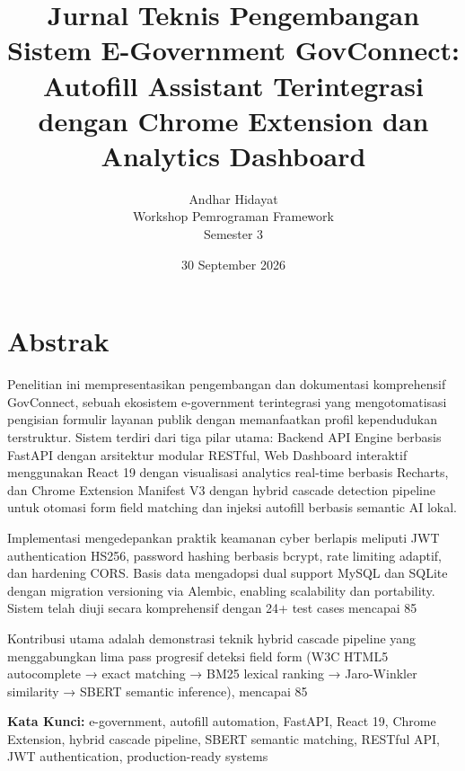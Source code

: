 \documentclass[12pt,a4paper]{article}
\title{\textbf{Jurnal Teknis Pengembangan Sistem E-Government GovConnect:\\
Autofill Assistant Terintegrasi dengan Chrome Extension dan Analytics Dashboard}}
\author{Andhar Hidayat\\
Workshop Pemrograman Framework\\
Semester 3}
\date{30 September 2026}
\begin{document}
\maketitle

\section*{Abstrak}

Penelitian ini mempresentasikan pengembangan dan dokumentasi komprehensif GovConnect, sebuah ekosistem e-government terintegrasi yang mengotomatisasi pengisian formulir layanan publik dengan memanfaatkan profil kependudukan terstruktur. Sistem terdiri dari tiga pilar utama: Backend API Engine berbasis FastAPI dengan arsitektur modular RESTful, Web Dashboard interaktif menggunakan React 19 dengan visualisasi analytics real-time berbasis Recharts, dan Chrome Extension Manifest V3 dengan hybrid cascade detection pipeline untuk otomasi form field matching dan injeksi autofill berbasis semantic AI lokal.

Implementasi mengedepankan praktik keamanan cyber berlapis meliputi JWT authentication HS256, password hashing berbasis bcrypt, rate limiting adaptif, dan hardening CORS. Basis data mengadopsi dual support MySQL dan SQLite dengan migration versioning via Alembic, enabling scalability dan portability. Sistem telah diuji secara komprehensif dengan 24+ test cases mencapai 85%

Kontribusi utama adalah demonstrasi teknik hybrid cascade pipeline yang menggabungkan lima pass progresif deteksi field form (W3C HTML5 autocomplete → exact matching → BM25 lexical ranking → Jaro-Winkler similarity → SBERT semantic inference), mencapai 85%

\vspace{12pt}
\noindent
\textbf{Kata Kunci:} e-government, autofill automation, FastAPI, React 19, Chrome Extension, hybrid cascade pipeline, SBERT semantic matching, RESTful API, JWT authentication, production-ready systems

\newpage

\tableofcontents

\newpage
\end{document}
